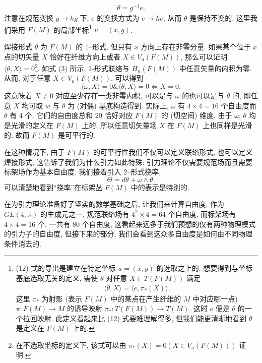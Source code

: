 \documentclass{article}
\begin{document}
\begin{align}
\theta=g^{-1}e.
\end{align}
注意在规范变换 $g\rightarrow hg$ 下, $e$ 的变换方式为 $e\rightarrow he$, 从而 $\theta$ 是保持不变的. 这里我们采用 $F(M)$ 的局部坐标\footnote{(12) 式的导出是建立在特定坐标 $u=(x,g)$ 的选取之上的. 想要得到与坐标基底选取无关的定义, 需使 $\theta$ 对任意 $X\in T(F(M))$ 满足
\begin{align}
\langle\theta,X\rangle=\langle e,\pi_{*}(X)\rangle.
\end{align}
这里 $\pi_{*}$ 为射影 (表示 $F(M)$ 中的某点在产生纤维的 $M$ 中对应哪一点) $\pi:F(M)\rightarrow M$ 的诱导映射 $\pi_{*}:T(F(M))\rightarrow T(M)$. 这时 $e$ 便是 $\theta$ 的一个拉回映射. 此定义看起来比 (12) 式要难理解得多, 但我们能更清晰地看到 $\theta$ 是定义在 $F(M)$ 上的.} $u=(x,g)$.

焊接形式 $\theta$ 为 $F(M)$ 的 1--形式, 但只有 $x$ 方向上存在非零分量. 如果某个位于 $x$ 点的切矢量 $X$ 恰好在纤维方向上或者 $X\in V_{u}(F(M))$, 那么可以证明 $\langle\theta,X\rangle=0$\footnote{在不选取坐标的定义下, 该式可以由 $\pi_{*}(X)=0(X\in V_{u}(F(M)))$ 证明.}. 如式 (3) 所示, 1-形式联络与 $H_{u}(F(M))$ 中任意矢量的内积为零. 从而, 对于任意 $X\in V_{u}(F(M))$, 可以得到
\begin{equation}
\langle\omega, X\rangle=0\&\langle \theta, X\rangle=0\Leftrightarrow X=0.
\end{equation}
这意味着 $X\neq 0$ 对应至少存在一类非零内积, 可以是与 $\omega$ 的也可以是与 $\theta$ 的, 即任意 $X$ 均可取 $w$ 与 $\theta$ 为 (对偶) 基底构造得到. 实际上, $\omega$ 有 $4\times4=16$ 个自由度而 $\theta$ 有 4 个, 它们的自由度总和 20 恰好对应 $F(M)$ 的 (切空间) 维度. 由于 $\omega$, $\theta$ 均是光滑的定义在 $F(M)$ 上的, 所以任意切矢量场 $X$ 在 $F(M)$ 上也同样是光滑的, 故而 $F(M)$ 是可平行的.

在这种情况下, 由于 $F(M)$ 的可平行性我们不仅可以定义联络形式, 也可以定义焊接形式, 这告诉了我们为什么引力如此特殊: 引力理论不仅需要规范场而且需要标架场作为基本自由度. 我们接着引入 2--形式挠率,
\begin{equation}
\Theta=d\theta+\omega\wedge \theta.
\end{equation}
可以清楚地看到“挠率”在标架丛 $F(M)$ 中的表示是特别的.

在为引力理论准备好了坚实的数学基础之后, 让我们来计算自由度. 作为 $GL(4,\mathbb{R})$ 的生成元之一, 规范联络场有 $4^{2}\times4=64$ 个自由度, 而标架场有 $4\times4=16$ 个. 一共有 80 个自由度, 这看起来远多于我们预想的仅有两种物理模式的引力子的自由度, 但接下来的部分, 我们会看到这众多自由度是如何由不同物理条件消去的.
\end{document}
